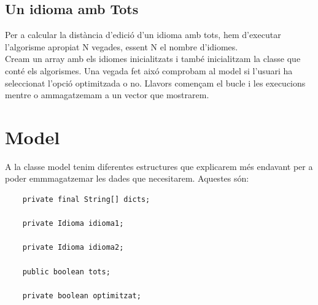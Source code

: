 \documentclass[conference]{IEEEtran}
\begin{document}
 
 \subsection{Un idioma amb Tots}
 Per a calcular la distància d'edició d'un idioma amb tots, hem d'executar l'algorisme apropiat N vegades, essent N el nombre d'idiomes.\\
 Cream un array amb els idiomes inicialitzats i també inicialitzam la classe que conté els algorismes. Una vegada fet aixó comprobam al model si l'usuari ha seleccionat l'opció optimitzada o no. Llavors començam el bucle i les execucions mentre o ammagatzemam a un vector que mostrarem.

\section{Model}
 A la classe model tenim diferentes estructures que explicarem més endavant per a poder emmmagatzemar les dades que necesitarem. Aquestes són:
    \begin{verbatim}
    private final String[] dicts;

    private Idioma idioma1;

    private Idioma idioma2;

    public boolean tots;

    private boolean optimitzat;
    \end{verbatim}
\end{document}

